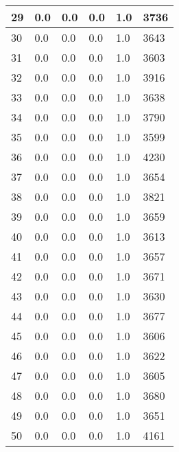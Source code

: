 \begin{longtable}{|l|l|l|l|l|l|}
29 & 0.0 & 0.0 & 0.0 & 1.0 & 3736 \\ \hline 
30 & 0.0 & 0.0 & 0.0 & 1.0 & 3643 \\ \hline 
31 & 0.0 & 0.0 & 0.0 & 1.0 & 3603 \\ \hline 
32 & 0.0 & 0.0 & 0.0 & 1.0 & 3916 \\ \hline 
33 & 0.0 & 0.0 & 0.0 & 1.0 & 3638 \\ \hline 
34 & 0.0 & 0.0 & 0.0 & 1.0 & 3790 \\ \hline 
35 & 0.0 & 0.0 & 0.0 & 1.0 & 3599 \\ \hline 
36 & 0.0 & 0.0 & 0.0 & 1.0 & 4230 \\ \hline 
37 & 0.0 & 0.0 & 0.0 & 1.0 & 3654 \\ \hline 
38 & 0.0 & 0.0 & 0.0 & 1.0 & 3821 \\ \hline 
39 & 0.0 & 0.0 & 0.0 & 1.0 & 3659 \\ \hline 
40 & 0.0 & 0.0 & 0.0 & 1.0 & 3613 \\ \hline 
41 & 0.0 & 0.0 & 0.0 & 1.0 & 3657 \\ \hline 
42 & 0.0 & 0.0 & 0.0 & 1.0 & 3671 \\ \hline 
43 & 0.0 & 0.0 & 0.0 & 1.0 & 3630 \\ \hline 
44 & 0.0 & 0.0 & 0.0 & 1.0 & 3677 \\ \hline 
45 & 0.0 & 0.0 & 0.0 & 1.0 & 3606 \\ \hline 
46 & 0.0 & 0.0 & 0.0 & 1.0 & 3622 \\ \hline 
47 & 0.0 & 0.0 & 0.0 & 1.0 & 3605 \\ \hline 
48 & 0.0 & 0.0 & 0.0 & 1.0 & 3680 \\ \hline 
49 & 0.0 & 0.0 & 0.0 & 1.0 & 3651 \\ \hline 
50 & 0.0 & 0.0 & 0.0 & 1.0 & 4161 \\ \hline 
\end{longtable}